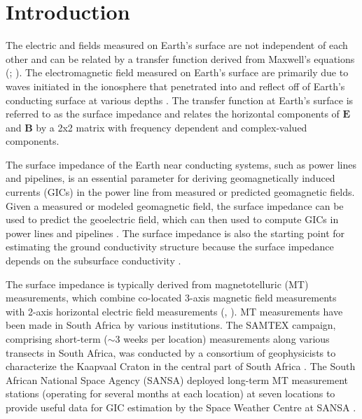 \documentclass[pdflatex,sn-basic]{sn-jnl}%
\begin{document}

\maketitle

\section{Introduction}

The electric and fields measured on Earth's surface are not independent of each other and can be related by a transfer function derived from Maxwell's equations (\cite{Vozoff1991}; \cite{Simpson2005}). The electromagnetic field measured on Earth's surface are primarily due to waves initiated in the ionosphere that penetrated into and reflect off of Earth's conducting surface at various depths \citep{Cagniard1953,Pirjola1982}. The transfer function at Earth's surface is referred to as the surface impedance and relates the horizontal components of $\mathbf{E}$ and $\mathbf{B}$ by a 2x2 matrix with frequency dependent and complex-valued components.

The surface impedance of the Earth near conducting systems, such as power lines and pipelines, is an essential parameter for deriving geomagnetically induced currents (GICs) in the power line from measured or predicted geomagnetic fields. Given a measured or modeled geomagnetic field, the surface impedance can be used to predict the geoelectric field, which can then used to compute GICs in power lines and pipelines \citep{Pirjola2000}. The surface impedance is also the starting point for estimating the ground conductivity structure because the surface impedance depends on the subsurface conductivity \citep{Simpson2005}.

The surface impedance is typically derived from magnetotelluric (MT) measurements, which combine co-located 3-axis magnetic field measurements with 2-axis horizontal electric field measurements (\cite{Naidu2012}, \cite{Simpson2005}). MT measurements have been made in South Africa by various institutions. The SAMTEX campaign, comprising short-term ($\sim$3 weeks per location) measurements along various transects in South Africa, was conducted by a consortium of geophysicists to characterize the Kaapvaal Craton in the central part of South Africa \citep{Jones2009}. The South African National Space Agency (SANSA) deployed long-term MT measurement stations (operating for several months at each location) at seven locations to provide useful data for GIC estimation by the Space Weather Centre at SANSA \citep{Kotz2015}.
\end{document}
